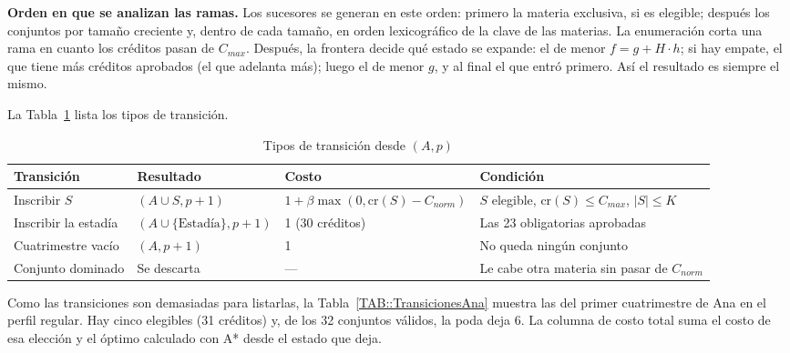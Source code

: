 \textbf{Orden en que se analizan las ramas.} Los sucesores se generan en este orden: primero la materia exclusiva, si es elegible; después los conjuntos por tamaño creciente y, dentro de cada tamaño, en orden lexicográfico de la clave de las materias. La enumeración corta una rama en cuanto los créditos pasan de $C_{max}$. Después, la frontera decide qué estado se expande: el de menor $f = g + H \cdot h$; si hay empate, el que tiene más créditos aprobados (el que adelanta más); luego el de menor $g$, y al final el que entró primero. Así el resultado es siempre el mismo.

La Tabla~\ref{TAB::Transiciones} lista los tipos de transición.

\begin{table}[H]
  \begin{center}
    \caption{Tipos de transición desde $(A, p)$}
    \label{TAB::Transiciones}
    \small
    \begin{tabular}{|| p{2.6cm} | p{3.6cm} | p{3.8cm} | p{3.2cm} ||}
        \hline
        Transición & Resultado & Costo & Condición \\ [0.5ex]
        \hline\hline
        Inscribir $S$ & $(A \cup S, p + 1)$ & $1 + \beta \max(0, \mathrm{cr}(S) - C_{norm})$ & $S$ elegible, $\mathrm{cr}(S) \leq C_{max}$, $|S| \leq K$ \\
        \hline
        Inscribir la estadía & $(A \cup \{\text{Estadía}\}, p + 1)$ & 1 (30 créditos) & Las 23 obligatorias aprobadas \\
        \hline
        Cuatrimestre vacío & $(A, p + 1)$ & 1 & No queda ningún conjunto \\
        \hline
        Conjunto dominado & Se descarta & --- & Le cabe otra materia sin pasar de $C_{norm}$ \\
        \hline
    \end{tabular}
  \end{center}
\end{table}

Como las transiciones son demasiadas para listarlas, la Tabla~\ref{TAB::TransicionesAna} muestra las del primer cuatrimestre de Ana en el perfil regular. Hay cinco elegibles (31 créditos) y, de los 32 conjuntos válidos, la poda deja 6. La columna de costo total suma el costo de esa elección y el óptimo calculado con A* desde el estado que deja.

